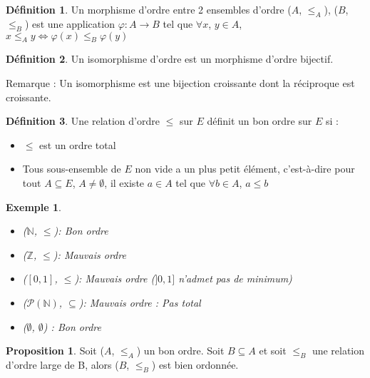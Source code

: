 \documentclass{article}
\theoremstyle{definition}
\newtheorem{definition}{Définition}
\theoremstyle{definition}
\newtheorem{prop}{Proposition}
\theoremstyle{definition}
\theoremstyle{plain}
\newtheorem{example}{Exemple}
\theoremstyle{theorem}
\theoremstyle{theorem}
\begin{document}
\begin{definition}

    Un morphisme d'ordre entre 2 ensembles d'ordre ($A$, $\leqslant_A$), ($B$, $\leqslant_B$) est une application $\varphi : A \to B$
    tel que $\forall x$, $y\in A$, $x \leqslant_A y \iff \varphi(x) \leqslant_B \varphi(y)$

\end{definition}

\begin{definition}

    Un isomorphisme d'ordre est un morphisme d'ordre bijectif.

    Remarque : Un isomorphisme est une bijection croissante dont la réciproque est croissante.

\end{definition}

\begin{definition}

    Une relation d'ordre $\leqslant$ sur $E$ définit un bon ordre sur $E$ si :
    \begin{itemize}
        \item $\leqslant$ est un ordre total
        \item Tous sous-ensemble de $E$ non vide a un plus petit élément, c'est-à-dire pour tout $A \subseteq E$, $A \neq \emptyset$, il existe
            $a \in A$ tel que $\forall b \in A$, $a \leqslant b$
    \end{itemize}

\end{definition}

\begin{example}
    \begin{itemize}
        \item ($\mathbb{N}$, $\leqslant$): Bon ordre
        \item ($\mathbb{Z}$, $\leqslant$): Mauvais ordre
        \item ($[0, 1]$, $\leqslant$): Mauvais ordre ($]0, 1]$ n'admet pas de minimum)
        \item ($\mathscr{P}(\mathbb{N})$, $\subseteq$): Mauvais ordre : Pas total
        \item ($\emptyset$, $\emptyset$) : Bon ordre
    \end{itemize} 
\end{example}

\begin{prop}
    Soit ($A$, $\leqslant_A$) un bon ordre. Soit $B \subseteq A$ et soit $\leqslant_B$ une relation d'ordre large de B, alors ($B$, $\leqslant_B$) est bien ordonnée.
\end{prop}
\end{document}
